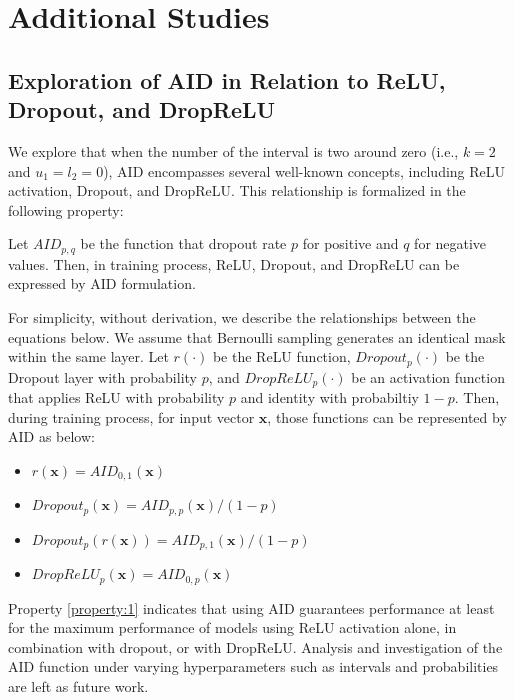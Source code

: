 

\section{Additional Studies}
\subsection{Exploration of AID in Relation to ReLU, Dropout, and DropReLU}
\label{app:relation}

We explore that when the number of the interval is two around zero (i.e., $k=2$ and $u_1=l_2=0$), AID encompasses several well-known concepts, including ReLU activation, Dropout, and DropReLU.
This relationship is formalized in the following property:

\begin{property}
    \label{property:1}
    Let $AID_{p,q}$ be the function that dropout rate $p$ for positive and $q$ for negative values.
    Then, in training process, ReLU, Dropout, and DropReLU can be expressed by AID formulation.
\end{property}

    For simplicity, without derivation, we describe the relationships between the equations below.
    We assume that Bernoulli sampling generates an identical mask within the same layer.
    Let $r(\cdot)$ be the ReLU function, $Dropout_p(\cdot)$ be the Dropout layer with probability $p$, and $DropReLU_p(\cdot)$ be an activation function that applies ReLU with probability $p$ and identity with probabiltiy $1-p$.
    Then, during training process, for input vector $\mathbf{x}$, those functions can be represented by AID as below:

\begin{itemize}
    \item $r(\mathbf{x}) = AID_{0,1}(\mathbf{x})$
    \item $Dropout_p(\mathbf{x}) = AID_{p,p}(\mathbf{x}) / (1-p)$
    \item $Dropout_p(r(\mathbf{x})) = AID_{p,1}(\mathbf{x}) / (1-p)$
    \item $DropReLU_p(\mathbf{x}) = AID_{0,p}(\mathbf{x})$
\end{itemize}

Property \ref{property:1} indicates that using AID guarantees performance at least for the maximum performance of models using ReLU activation alone, in combination with dropout, or with DropReLU.
Analysis and investigation of the AID function under varying hyperparameters such as intervals and probabilities are left as future work.



